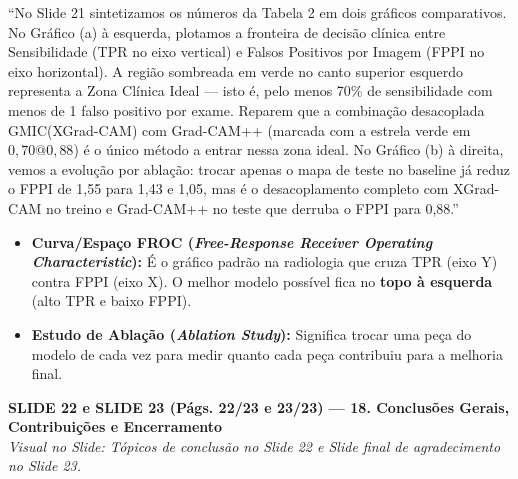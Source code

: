 \documentclass[11pt,a4paper]{article}
\newcommand{\slideheader}[3]{%
    \vspace{10pt}%
    \begin{tcolorbox}[colback=slateborder, colframe=slateborder, coltext=white, boxrule=0pt, arc=3pt, left=8pt, right=8pt, top=5pt, bottom=5pt]
        {\large\bfseries #1 — #2}\\[2pt]
        {\small\itshape Visual no Slide: #3}
    \end{tcolorbox}%
}
\newenvironment{falabox}{%
    \begin{tcolorbox}[colback=speechbg, colframe=speechborder, boxrule=1.2pt, arc=4pt, left=10pt, right=10pt, top=8pt, bottom=8pt, title={\bfseries O QUE VOCÊ DEVE FALAR (Fala Sugerida)}]%
}{%
    \end{tcolorbox}%
}
\newenvironment{explicabox}{%
    \begin{tcolorbox}[colback=explainbg, colframe=explainborder, boxrule=0.8pt, arc=4pt, left=10pt, right=10pt, top=8pt, bottom=8pt, title={\bfseries ENTENDA O QUE VOCÊ ESTÁ FALANDO (Explicação Didática de Cada Termo)}]%
}{%
    \end{tcolorbox}%
}
\begin{document}
\begin{falabox}
``No Slide 21 sintetizamos os números da Tabela 2 em dois gráficos comparativos. No Gráfico (a) à esquerda, plotamos a fronteira de decisão clínica entre Sensibilidade (TPR no eixo vertical) e Falsos Positivos por Imagem (FPPI no eixo horizontal). A região sombreada em verde no canto superior esquerdo representa a Zona Clínica Ideal — isto é, pelo menos 70\% de sensibilidade com menos de 1 falso positivo por exame. Reparem que a combinação desacoplada GMIC(XGrad-CAM) com Grad-CAM++ (marcada com a estrela verde em $0{,}70@0{,}88$) é o único método a entrar nessa zona ideal. No Gráfico (b) à direita, vemos a evolução por ablação: trocar apenas o mapa de teste no baseline já reduz o FPPI de 1,55 para 1,43 e 1,05, mas é o desacoplamento completo com XGrad-CAM no treino e Grad-CAM++ no teste que derruba o FPPI para 0,88.''
\end{falabox}

\begin{explicabox}
\begin{itemize}[leftmargin=*, itemsep=4pt]
    \item \textbf{Curva/Espaço FROC (\textit{Free-Response Receiver Operating Characteristic}):} É o gráfico padrão na radiologia que cruza TPR (eixo Y) contra FPPI (eixo X). O melhor modelo possível fica no \textbf{topo à esquerda} (alto TPR e baixo FPPI).
    \item \textbf{Estudo de Ablação (\textit{Ablation Study}):} Significa trocar uma peça do modelo de cada vez para medir quanto cada peça contribuiu para a melhoria final.
\end{itemize}
\end{explicabox}

\newpage
\slideheader{SLIDE 22 e SLIDE 23 (Págs. 22/23 e 23/23)}{18. Conclusões Gerais, Contribuições e Encerramento}{Tópicos de conclusão no Slide 22 e Slide final de agradecimento no Slide 23.}
\end{document}
